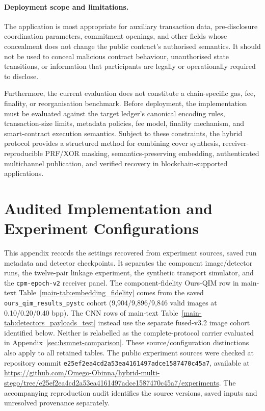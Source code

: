 \documentclass[journal]{IEEEtran}
\theoremstyle{definition}
\theoremstyle{game}
\begin{document}
\paragraph{Deployment scope and limitations.}
The application is most appropriate for auxiliary transaction
data, pre-disclosure coordination parameters, commitment openings,
and other fields whose concealment does not change the public
contract's authorised semantics. It should not be used to conceal
malicious contract behaviour, unauthorised state transitions, or
information that participants are legally or operationally
required to disclose.

Furthermore, the current evaluation does not constitute a
chain-specific gas, fee, finality, or reorganisation benchmark.
Before deployment, the implementation must be evaluated against
the target ledger's canonical encoding rules, transaction-size
limits, metadata policies, fee model, finality mechanism, and
smart-contract execution semantics. Subject to these constraints,
the hybrid protocol provides a structured method for combining
cover synthesis, receiver-reproducible PRF/XOR masking, semantics-preserving
embedding, authenticated multichannel publication, and verified
recovery in blockchain-supported applications. 



\section{Audited Implementation and Experiment Configurations}
\label{sec:reproducibility}

This appendix records the settings recovered from experiment sources,
saved run metadata and detector checkpoints. It separates the component
image/detector runs, the twelve-pair linkage experiment, the
synthetic transport simulator, and the \texttt{cpm-epoch-v2}
receiver panel. The component-fidelity Ours-QIM row in main-text
Table~\ref{main-tab:embedding_fidelity} comes from the saved
\texttt{ours\_qim\_results\_pystc} cohort (9,904/9,896/9,846 valid images
at 0.10/0.20/0.40 bpp). The CNN rows of main-text
Table~\ref{main-tab:detectors_payloads_test} instead use the separate
fused-v3.2 image cohort identified below. Neither is relabelled as the
complete-protocol carrier evaluated in Appendix~\ref{sec:hsmnet-comparison}.
These source/configuration distinctions also apply to all retained tables.
The public experiment sources were checked at repository commit
\nolinkurl{e25ef2ea4cd2a53ea4161497adce1587470c45a7}, available at
\url{https://github.com/Omego-Obinna/hybrid-multi-stego/tree/e25ef2ea4cd2a53ea4161497adce1587470c45a7/experiments}.
The accompanying reproduction audit identifies the source versions,
saved inputs and unresolved provenance separately.
\end{document}
